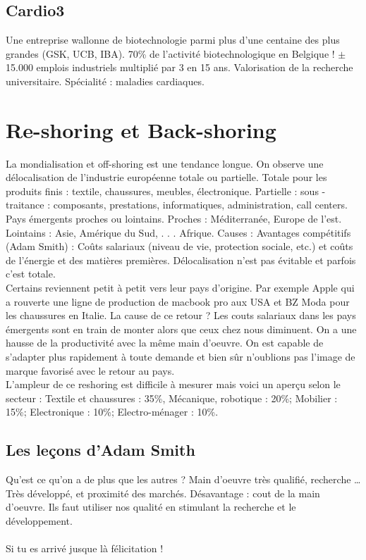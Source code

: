 \subsection{Cardio3}
Une entreprise wallonne de biotechnologie parmi plus d’une centaine des plus grandes (GSK, UCB, IBA). 70\% de l'activité biotechnologique en Belgique ! $\pm$ 15.000 emplois industriels multiplié par 3 en 15 ans. Valorisation de la recherche universitaire. Spécialité : maladies cardiaques.

\section{Re-shoring et Back-shoring}
La mondialisation et off-shoring est une tendance longue. On observe une
 délocalisation de l’industrie européenne totale ou partielle. Totale pour les
  produits finis : textile, chaussures, meubles, électronique. Partielle : sous
  -traitance : composants, prestations, informatiques, administration, call
   centers. Pays émergents proches ou lointains. Proches : Méditerranée,
    Europe de l’est. Lointains : Asie, Amérique du Sud, . . . Afrique. Causes :
     Avantages compétitifs (Adam Smith) : Coûts salariaux (niveau de vie, 
     protection sociale, etc.) et coûts de l’énergie et des matières premières.
Délocalisation n'est pas évitable et parfois c'est totale. \\
Certains reviennent petit à petit vers leur pays d'origine. Par exemple Apple qui a rouverte une ligne de production de macbook pro aux USA et BZ Moda pour les chaussures en Italie. La cause de ce retour ? Les couts salariaux dans les pays émergents sont en train de monter alors que ceux chez nous diminuent. On a une hausse de la productivité avec la même main d’oeuvre. On est capable de s'adapter plus rapidement à toute demande et bien sûr n'oublions pas l'image de marque favorisé avec le retour au pays. \\
L'ampleur de ce reshoring est difficile à mesurer mais voici un aperçu selon
 le secteur : Textile et chaussures : 35\%, Mécanique, robotique : 20\%;
  Mobilier : 15\%; Electronique : 10\%; Electro-ménager : 10\%.

\subsection{Les leçons d'Adam Smith}
Qu’est ce qu’on a de plus que les autres ? Main d’oeuvre très qualifié, recherche … Très développé, et proximité des marchés. Désavantage : cout de la main d’oeuvre. Ils faut utiliser nos qualité en stimulant la recherche et le développement.\\
\\
Si tu es arrivé jusque là félicitation !